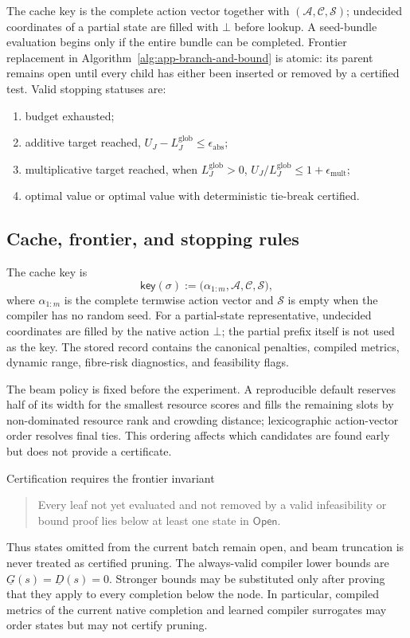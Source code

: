 \documentclass[a4paper,onecolumn,11pt,unpublished]{quantumarticle}
\theoremstyle{remark}
\begin{document}
The cache key is the complete action vector together with
$(\mathcal A,\mathcal C,\mathcal S)$; undecided coordinates of a partial state are filled
with $\bot$ before lookup.  A seed-bundle evaluation begins only if the entire bundle can
be completed.  Frontier replacement in Algorithm~\ref{alg:app-branch-and-bound} is
atomic: its parent remains open until every child has either been inserted or removed by
a certified test.  Valid stopping statuses are:
\begin{enumerate}
    \item budget exhausted;
    \item additive target reached,
    $U_J-L_J^{\mathrm{glob}}\le\epsilon_{\mathrm{abs}}$;
    \item multiplicative target reached, when $L_J^{\mathrm{glob}}>0$,
    $U_J/L_J^{\mathrm{glob}}\le1+\epsilon_{\mathrm{mult}}$;
    \item optimal value or optimal value with deterministic tie-break certified.
\end{enumerate}

\subsection{Cache, frontier, and stopping rules}
\label{app:selection-implementation}
\label{app:selection-stopping-rules}

The cache key is
\begin{equation}
    \mathsf{key}(\sigma)
    :=
    \bigl(
        \alpha_{1:m},
        \mathcal A,
        \mathcal C,
        \mathcal S
    \bigr),
    \label{eq:appendix-cache-key}
\end{equation}
where \(\alpha_{1:m}\) is the complete termwise action vector and
\(\mathcal S\) is empty when the compiler has no random seed.  For a
partial-state representative, undecided coordinates are filled by the
native action \(\bot\); the partial prefix itself is not used as the key.
The stored record contains the canonical penalties, compiled metrics,
dynamic range, fibre-risk diagnostics, and feasibility flags.

The beam policy is fixed before the experiment.  A reproducible default
reserves half of its width for the smallest resource scores and fills the
remaining slots by non-dominated resource rank and crowding distance;
lexicographic action-vector order resolves final ties.  This ordering affects
which candidates are found early but does not provide a certificate.

Certification requires the frontier invariant
\begin{quote}
Every leaf not yet evaluated and not removed by a valid infeasibility or
bound proof lies below at least one state in \(\mathsf{Open}\).
\end{quote}
Thus states omitted from the current batch remain open, and beam truncation
is never treated as certified pruning.  The always-valid compiler lower
bounds are
\(\underline G(s)=\underline D(s)=0\).  Stronger bounds may be substituted
only after proving that they apply to every completion below the node.  In
particular, compiled metrics of the current native completion and learned
compiler surrogates may order states but may not certify pruning.
\end{document}
